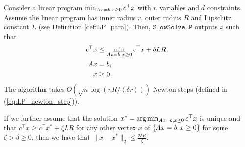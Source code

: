 \begin{thm}
\label{thm:SlowSolveLP}Consider a linear program $\min_{A x=b,x\geq0}c^{\top}x$
with $n$ variables and $d$ constraints. Assume the linear program
has inner radius $r$, outer radius $R$ and Lipschitz constant $L$
(see Definition \ref{def:LP_para}). Then, $\mathtt{SlowSolveLP}$
outputs $x$ such that
\begin{align*}
c^{\top}x & \leq\min_{A x=b,x\geq0}c^{\top}x+\delta LR,\\
A x & =b,\\
x & \geq0.
\end{align*}
The algorithm takes $O(\sqrt{n}\log(nR/(\delta r)))$ Newton steps
(defined in (\ref{eq:LP_newton_step})).

If we further assume that the solution $x^{*}=\arg\min_{A x=b,x\geq0}c^{\top}x$
is unique and that $c^{\top}x\geq c^{\top}x^{*}+\zeta LR$ for any
other vertex $x$ of $\{A x=b,x\geq0\}$ for some $\zeta>\delta\geq0$,
then we have that $\|x-x^{*}\|_{2}\leq\frac{2\delta R}{\zeta}$.
\end{thm}

